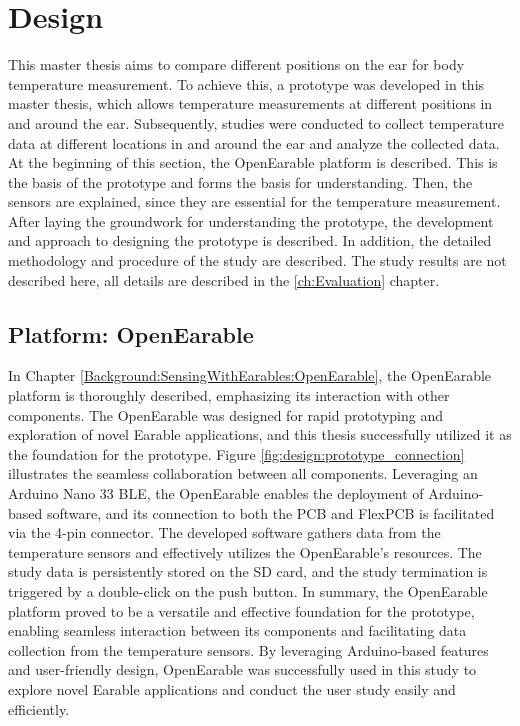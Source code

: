 \chapter{Design}
\label{ch:Design}
This master thesis aims to compare different positions on the ear for body temperature measurement. 
To achieve this, a prototype was developed in this master thesis, which allows temperature measurements at different positions in and around the ear. 
Subsequently, studies were conducted to collect temperature data at different locations in and around the ear and analyze the collected data.
At the beginning of this section, the OpenEarable platform is described. This is the basis of the prototype and forms the basis for understanding. Then, the sensors are explained, since they are essential for the temperature measurement.
After laying the groundwork for understanding the prototype, the development and approach to designing the prototype is described.
In addition, the detailed methodology and procedure of the study are described.
The study results are not described here, all details are described in the \ref{ch:Evaluation} chapter.

\section{Platform: OpenEarable}
\label{ch:Design:Prototype:OpenEarable}

In Chapter \ref{Background:SensingWithEarables:OpenEarable}, the OpenEarable platform is thoroughly described, emphasizing its interaction with other components. 
The OpenEarable was designed for rapid prototyping and exploration of novel Earable applications, and this thesis successfully utilized it as the foundation for the prototype. 
Figure \ref{fig:design:prototype_connection} illustrates the seamless collaboration between all components. 
Leveraging an Arduino Nano 33 BLE, the OpenEarable enables the deployment of Arduino-based software, and its connection to both the PCB and FlexPCB is facilitated via the 4-pin connector. 
The developed software gathers data from the temperature sensors and effectively utilizes the OpenEarable's resources. 
The study data is persistently stored on the SD card, and the study termination is triggered by a double-click on the push button.
In summary, the OpenEarable platform proved to be a versatile and effective foundation for the prototype, enabling seamless interaction between its components and facilitating data collection from the temperature sensors. 
By leveraging Arduino-based features and user-friendly design, OpenEarable was successfully used in this study to explore novel Earable applications and conduct the user study easily and efficiently.

